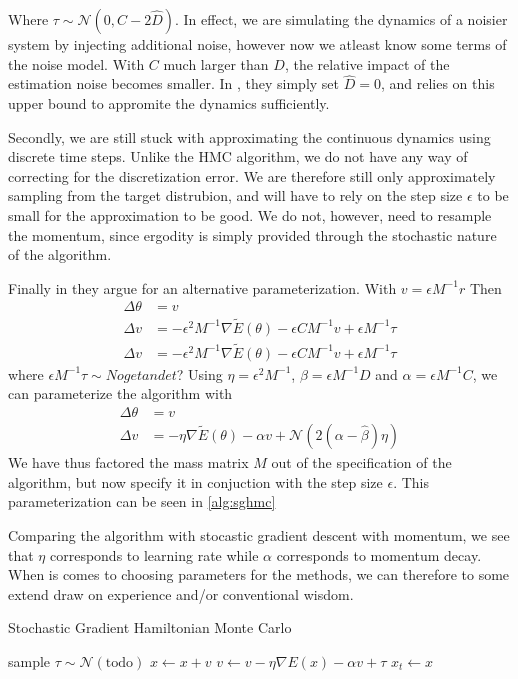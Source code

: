 Where $\tau\sim  \mathcal{N}(0, C - 2\hat{D})$.
In effect, we are simulating the dynamics of a noisier system by injecting additional noise, however now we atleast know some terms of the noise model.
With $C$ much larger than $D$, the relative impact of the estimation noise becomes smaller. 
In \cite{chen_stochastic_2014}, they simply set $\hat{D} = 0$, and relies on this upper bound to appromite the dynamics sufficiently.  

Secondly, we are still stuck with approximating the continuous dynamics using discrete time steps.
Unlike the HMC algorithm, we do not have any way of correcting for the discretization error. 
We are therefore still only approximately sampling from the target distrubion, and will have to rely on the step size $\epsilon$ to be small for the approximation to be good.
We do not, however, need to resample the momentum, since ergodity is simply provided through the stochastic nature of the algorithm.

Finally in \cite{chen_stochastic_2014} they argue for an alternative parameterization.
With $v = \epsilon M^{-1} r$ Then
\begin{align}
    \Delta \theta &=  v \\
    \Delta v &=  -\epsilon^2 M^{-1} \nabla\tilde{E}(\theta) - \epsilon CM^{-1}v  + \epsilon M^{-1}\tau \\
    \Delta v &=  -\epsilon^2 M^{-1} \nabla\tilde{E}(\theta) - \epsilon CM^{-1}v  + \epsilon M^{-1}\tau
\end{align}
where $\epsilon M^{-1}\tau\sim Noget andet$? Using $\eta = \epsilon^2M^{-1}$, $\beta = \epsilon M^{-1} D$ and $\alpha = \epsilon M^{-1}C$, we can parameterize the algorithm with
\begin{align}
    \Delta \theta &=  v \\
    \Delta v &=  -\eta \nabla\tilde{E}(\theta) - \alpha v  + \mathcal{N}(2(\alpha-\hat{\beta})\eta)
\end{align}
We have thus factored the mass matrix $M$ out of the specification of the algorithm, but now specify it in conjuction with the step size $\epsilon$. 
This parameterization can be seen in \cref{alg:sghmc}

Comparing the algorithm with stocastic gradient descent with momentum, we see that  $\eta$ corresponds to learning rate while $\alpha$ corresponds to momentum decay. 
When is comes to choosing parameters for the methods, we can therefore to some extend draw on experience and/or conventional wisdom.

\begin{algorithm}[H]
    \caption{Stochastic Gradient Hamiltonian Monte Carlo} \label{alg:sghmc}
    \begin{algorithmic}
        \State sample $\tau \sim \mathcal{N}(\text{todo})$
        \State $x\gets x + v $ 
        \State $v\gets v - \eta \nabla E(x) - \alpha v + \tau$
        \EndFor
        \State $x_{t} \gets x$
        \EndFor
    \end{algorithmic}
\end{algorithm}

